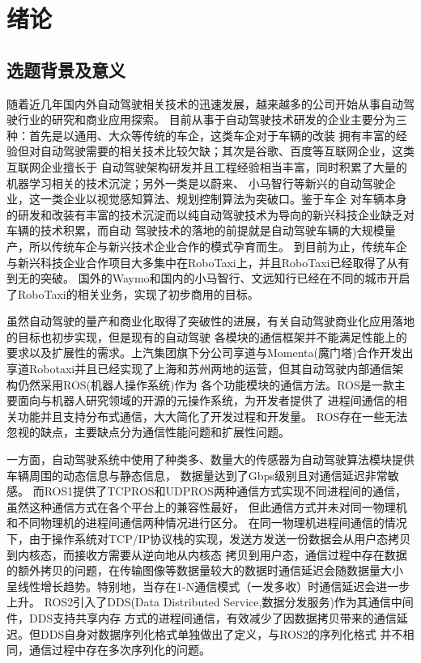 \chapter{绪论}
\section{选题背景及意义}
随着近几年国内外自动驾驶相关技术的迅速发展，越来越多的公司开始从事自动驾驶行业的研究和商业应用探索\cite{qiuwei}。
目前从事于自动驾驶技术研发的企业主要分为三种：首先是以通用、大众等传统的车企，这类车企对于车辆的改装
拥有丰富的经验但对自动驾驶需要的相关技术比较欠缺；其次是谷歌、百度等互联网企业，这类互联网企业擅长于
自动驾驶架构研发并且工程经验相当丰富，同时积累了大量的机器学习相关的技术沉淀；另外一类是以蔚来、
小马智行等新兴的自动驾驶企业，这一类企业以视觉感知算法、规划控制算法为突破口\cite{xiaoxi}。鉴于车企
对车辆本身的研发和改装有丰富的技术沉淀而以纯自动驾驶技术为导向的新兴科技企业缺乏对车辆的技术积累，而自动
驾驶技术的落地的前提就是自动驾驶车辆的大规模量产，所以传统车企与新兴技术企业合作的模式孕育而生\cite{yty}。
到目前为止，传统车企与新兴科技企业合作项目大多集中在RoboTaxi上，并且RoboTaxi已经取得了从有到无的突破。
国外的Waymo和国内的小马智行、文远知行已经在不同的城市开启了RoboTaxi的相关业务，实现了初步商用的目标\cite{xmh}。

虽然自动驾驶的量产和商业化取得了突破性的进展，有关自动驾驶商业化应用落地的目标也初步实现，但是现有的自动驾驶
各模块的通信框架并不能满足性能上的要求以及扩展性的需求。上汽集团旗下分公司享道与Momenta(魔门塔)合作开发出
享道Robotaxi并且已经实现了上海和苏州两地的运营，但其自动驾驶内部通信架构仍然采用ROS(机器人操作系统)作为
各个功能模块的通信方法\cite{zzq}。ROS是一款主要面向与机器人研究领域的开源的元操作系统，为开发者提供了
进程间通信的相关功能并且支持分布式通信，大大简化了开发过程和开发量。
ROS存在一些无法忽视的缺点，主要缺点分为通信性能问题和扩展性问题\cite{9545285}。

一方面，自动驾驶系统中使用了种类多、数量大的传感器为自动驾驶算法模块提供车辆周围的动态信息与静态信息，
数据量达到了Gbps级别且对通信延迟非常敏感。
而ROS1提供了TCPROS和UDPROS两种通信方式实现不同进程间的通信，虽然这种通信方式在各个平台上的兼容性最好，
但此通信方式并未对同一物理机和不同物理机的进程间通信两种情况进行区分。
在同一物理机进程间通信的情况下，由于操作系统对TCP/IP协议栈的实现，发送方发送一份数据会从用户态拷贝到内核态，而接收方需要从逆向地从内核态
拷贝到用户态，通信过程中存在数据的额外拷贝的问题，在传输图像等数据量较大的数据时通信延迟会随数据量大小
呈线性增长趋势。特别地，当存在1-N通信模式（一发多收）时通信延迟会进一步上升\cite{9591166,Maruyama2016ExploringTP}。
ROS2引入了DDS(Data Distributed Service,数据分发服务)作为其通信中间件\cite{8607261}，DDS支持共享内存
方式的进程间通信，有效减少了因数据拷贝带来的通信延迟。但DDS自身对数据序列化格式单独做出了定义，与ROS2的序列化格式
并不相同，通信过程中存在多次序列化的问题\cite{Maruyama2016ExploringTP}。

